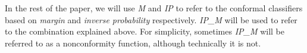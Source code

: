 In the rest of the paper, we will use \textit{M} and \textit{IP} to refer to the 
conformal classifiers based on \textit{margin} and \textit{inverse probability}
respectively. \textit{IP\_M} will be used to refer to the combination explained
above.
For simplicity, sometimes \textit{IP\_M} will be
referred to as a nonconformity function, although technically it is not.

